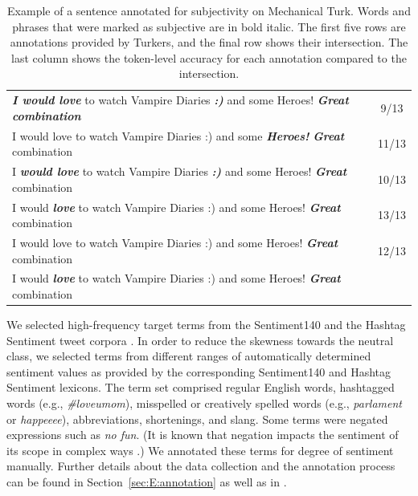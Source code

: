 \documentclass[11pt]{article}
\begin{document}
\begin{table}[t]
\centering
\small
\begin{tabular}{@{}l@{ }@{ }@{ }@{ }|@{ }@{ }c@{}}
\hline
\textbf{\textit{I would love}} to watch Vampire Diaries \textbf{\textit{:)}} and some Heroes! \textbf{\textit{Great combination}} & 9/13 \\
I would love to watch Vampire Diaries :) and some \textbf{\textit{Heroes!}} \textbf{\textit{Great}} combination & 11/13 \\
I \textbf{\textit{would love}} to watch Vampire Diaries \textbf{\textit{:)}} and some Heroes! \textbf{\textit{Great}} combination & 10/13 \\
I would \textbf{\textit{love}} to watch Vampire Diaries :) and some Heroes! \textbf{\textit{Great}} combination & 13/13 \\
I would love to watch Vampire Diaries :) and some Heroes! \textbf{\textit{Great}} combination & 12/13\\
\hline
I would \textbf{\textit{love}} to watch Vampire Diaries :) and some Heroes! \textbf{\textit{Great}} combination & \\
\hline
\end{tabular}
\caption{Example of a sentence annotated for subjectivity on Mechanical Turk. Words and phrases that were marked as subjective are in bold italic. The first five rows are annotations provided by Turkers, and the final row shows their intersection. The last column shows the token-level accuracy for each annotation compared to the intersection.}
\label{T:Annotation}
\end{table}

We selected high-frequency target terms from the Sentiment140 and the Hashtag Sentiment tweet corpora \cite{NRCJAIR14}.
In order to reduce the skewness towards the neutral class, we selected terms from different ranges of automatically determined sentiment values as provided by the corresponding Sentiment140 and Hashtag Sentiment lexicons.
The term set comprised regular English words, hashtagged words (e.g., \emph{\#loveumom}), misspelled or creatively spelled words (e.g., \emph{parlament} or \emph{happeeee}), abbreviations, shortenings, and slang. 
Some terms were negated expressions such as \emph{no fun}. (It is known that negation impacts the sentiment of its scope in complex ways \cite{zhu-EtAl:2014:P14-1}.) 
We annotated these terms for degree of sentiment manually. 
Further details about the data collection and the annotation process can be found in Section~\ref{sec:E:annotation} as well as in \cite{NRCJAIR14}.
\end{document}
